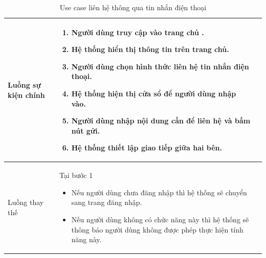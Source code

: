 \documentclass[12pt,a4paper]{article}
\begin{document}
\begin{table}[H]
\begin{tabular}{|p{3.5cm}|p{11.5cm}|c|}
            Luồng sự kiện chính & \vspace{-.8cm}\begin{enumerate}
                                                    \item Người dùng truy cập vào trang chủ .
                                                    \item Hệ thống hiển thị thông tin trên trang chủ.
                                                    \item Người dùng chọn hình thức liên hệ tin nhắn điện thoại.
                                                    \item Hệ thống hiện thị cửa sổ để người dùng nhập vào.
                                                    \item Người dùng nhập nội dung cần để liên hệ và bấm nút gửi.
                                                    \item Hệ thống thiết lập giao tiếp giữa hai bên.
            \end{enumerate}
            \\
            \hline
            Luồng thay thế & Tại bước 1\newline
            \vspace{-.8cm}\begin{itemize}
                              \item Nếu người dùng chưa đăng nhập thì hệ thống sẽ chuyển sang trang đăng nhập.
                              \item Nếu người dùng không có chức năng này thì hệ thống sẽ thông báo người dùng không được phép thực hiện tính năng này.
            \end{itemize}

            \\ \hline
        \end{tabular}
        \caption{Use case liên hệ thông qua tin nhắn điện thoại}

    \end{table}

\end{document}
